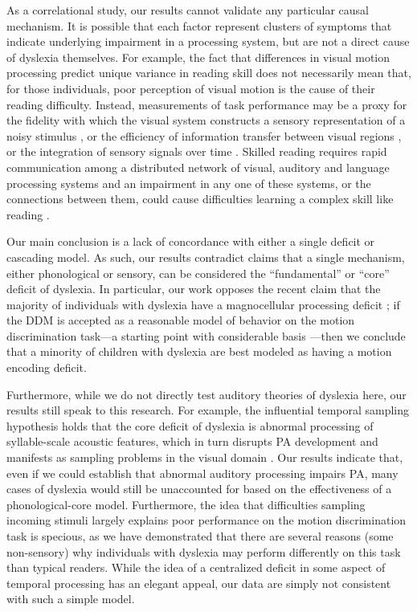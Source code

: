 \documentclass[../uwthesis.tex]{subfiles}
\begin{document}
As a correlational study, our results cannot validate any particular causal mechanism. It is possible that each factor represent clusters of symptoms that indicate underlying impairment in a processing system, but are not a direct cause of dyslexia themselves. For example, the fact that differences in visual motion processing predict unique variance in reading skill does not necessarily mean that, for those individuals, poor perception of visual motion is the cause of their reading difficulty. Instead, measurements of task performance may be a proxy for the fidelity with which the visual system constructs a sensory representation of a noisy stimulus \citep{Sperling2005DeficitsDyslexia}, or the efficiency of information transfer between visual regions
\citep{Yeatman2012DevelopmentSkills,Yeatman2013AnatomyConnections}, or the integration of sensory signals over time \citep{Joo2017}. Skilled reading requires rapid communication among a distributed network of visual, auditory and language processing systems and an impairment in any one of these systems, or the connections between them, could cause difficulties learning a complex skill like reading \citep{Wandell2013BiologicalCircuits}.

Our main conclusion is a lack of concordance with either a single deficit or cascading model. As such, our results contradict claims that a single mechanism, either phonological or sensory, can be considered the “fundamental” or “core” deficit of dyslexia. In particular, our work opposes the recent claim that the majority of individuals with dyslexia have a magnocellular processing deficit \citep{Stein2018TheDyslexia}; if the DDM is accepted as a reasonable model of behavior on the motion discrimination task---a starting point with considerable basis \citep{Huang-Pollock2017UsingDisorder,Palmer2005TheDecision,Ratcliff2008TheTasks}---then we conclude that a minority of children with dyslexia are best modeled as having a motion encoding deficit. 

Furthermore, while we do not directly test auditory theories of dyslexia here, our results still speak to this research. For example, the influential temporal sampling hypothesis holds that the core deficit of dyslexia is abnormal processing of syllable-scale acoustic features, which in turn disrupts PA development and manifests as sampling problems in the visual domain \citep{Casini2018ItsDyslexia,Goswami2011}. Our results indicate that, even if we could establish that abnormal auditory processing impairs PA, many cases of dyslexia would still be unaccounted for based on the effectiveness of a phonological-core model. Furthermore, the idea that difficulties sampling incoming stimuli largely explains poor performance on the motion discrimination task is specious, as we have demonstrated that there are several reasons (some non-sensory) why individuals with dyslexia may perform differently on this task than typical readers. While the idea of a centralized deficit in some aspect of temporal processing has an elegant appeal, our data are simply not consistent with such a simple model. 
\end{document}
